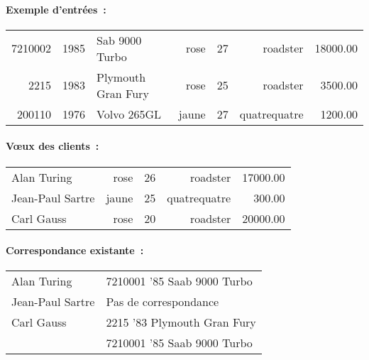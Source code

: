 \paragraph{Exemple d'entr\'ees~:}
\mbox{}\par
\begin{tabular}{rllrrrr}
  7210002 & 1985 & Sab 9000 Turbo    &      rose & 27 & roadster& 18000.00 \\
  2215 & 1983 & Plymouth Gran Fury &   rose & 25 & roadster & 3500.00 \\
  200110 & 1976 & Volvo 265GL        &    jaune & 27 & quatrequatre & 1200.00
\end{tabular}
\paragraph{V\oe{}ux des clients~:}
\mbox{}\par
\begin{tabular}{lrrrr}
Alan Turing &                rose& 26 & roadster& 17000.00 \\
Jean-Paul Sartre &          jaune& 25 & quatrequatre &  300.00 \\
Carl Gauss     &           rose & 20&  roadster& 20000.00
\end{tabular}
\paragraph{Correspondance existante~:}
\mbox{}\par
\begin{tabular}{ll}
Alan Turing & 7210001 '85 Saab 9000 Turbo\\
Jean-Paul Sartre & Pas de correspondance \\
Carl Gauss & 2215 '83 Plymouth Gran Fury \\
  &        7210001 '85 Saab 9000 Turbo
\end{tabular}
